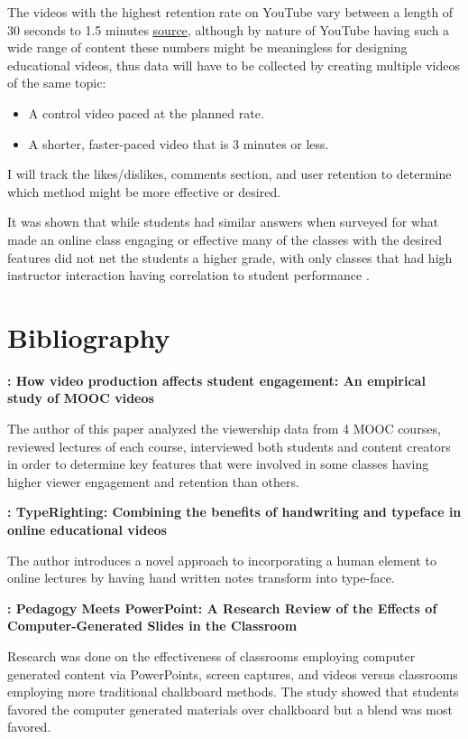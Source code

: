 \documentclass[
	letterpaper, %
]{jdf}
\begin{document}
The videos with the highest retention rate on YouTube vary between a length of 30 seconds to 1.5 minutes \href{https://tubularinsights.com/optimal-video-length-youtube-facebook/}{source}, although by nature of YouTube having such a wide range of content these numbers might be meaningless for designing educational videos, thus data will have to be collected by creating multiple videos of the same topic:

\begin{itemize}
    \item A control video paced at the planned rate.
    \item A shorter, faster-paced video that is 3 minutes or less.
\end{itemize}

I will track the likes/dislikes, comments section, and user retention to determine which method might be more effective or desired. 

It was shown that while students had similar answers when surveyed for what made an online class engaging or effective \citep{means2009evaluation} many of the classes with the desired features did not net the students a higher grade, with only classes that had high instructor interaction having correlation to student performance \citep{jordan10} \citep{smith1}.

\section{Bibliography}

\textbf{\cite{guo11}: How video production affects student engagement: An empirical study of MOOC videos}

The author of this paper analyzed the viewership data from 4 MOOC courses, reviewed lectures of each course, interviewed both students and content creators in order to determine key features that were involved in some classes having higher viewer engagement and retention than others.

\textbf{\cite{cross12}: TypeRighting: Combining the benefits of handwriting and typeface in online educational videos}

The author introduces a novel approach to incorporating a human element to online lectures by having hand written notes transform into type-face. 

\textbf{\cite{leva13}: Pedagogy Meets PowerPoint: A Research Review of the Effects of Computer-Generated Slides in the Classroom}

Research was done on the effectiveness of classrooms employing computer generated content via PowerPoints, screen captures, and videos versus classrooms employing more traditional chalkboard methods. The study showed that students favored the computer generated materials over chalkboard but a blend was most favored.
\end{document}
